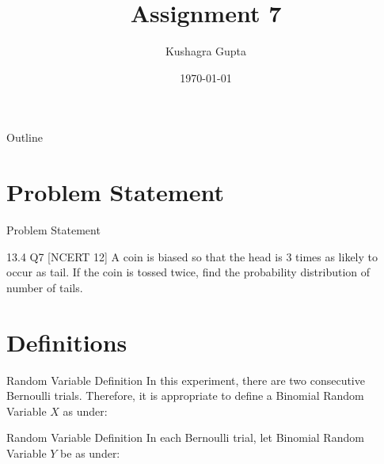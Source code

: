\documentclass{beamer}
\title{Assignment 7}
\author{Kushagra Gupta}
\date{\today}
\begin{document}
\begin{frame}
    \titlepage 
\end{frame}

\logo{}


\begin{frame}{Outline}
    \tableofcontents
\end{frame}



\section{Problem Statement}
\begin{frame}{Problem Statement}
    \begin{block}{13.4 Q7 [NCERT 12] } A coin is biased so that the head is 3 times as likely to occur as tail. If the coin is tossed twice, find the probability distribution of number of tails.
    \end{block}
\end{frame}



\section{Definitions}
\begin{frame}{Random Variable Definition}
In this experiment, there are two consecutive Bernoulli trials. Therefore, it is appropriate to define a Binomial Random Variable $X$ as under:


\begin{table}[ht!]
    \centering
    
    \caption{Random Variable $X$}
	\label{table:table1}
\end{table}

  
\end{frame}

\begin{frame}{Random Variable Definition}
In each Bernoulli trial, let Binomial Random Variable $Y$ be as under:

\begin{table}[ht!]
    \centering
    
    \caption{Random Variable $Y$}
	\label{table:table2}
\end{table}
\end{frame}
\end{document}

